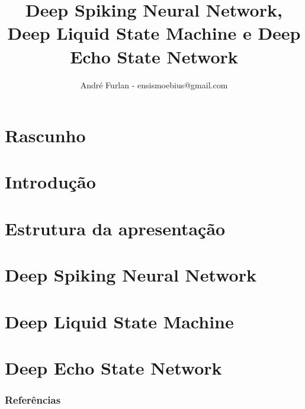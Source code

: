 

\title{Deep Spiking Neural Network, Deep Liquid	State Machine e Deep Echo State Network}


\author{André Furlan - ensismoebius@gmail.com}

\date{\the\year}


	
	\frame{\titlepage}
	
	\section{Rascunho}
		
	
	\section{Introdução}
		

	\section{Estrutura da apresentação}
		

	\section{Deep Spiking Neural Network}
		
	\section{Deep Liquid State Machine}
		
	\section{Deep Echo State Network}
		
	
	\begin{frame}[allowframebreaks]
		\frametitle{Referências}
		
	\end{frame}
	

